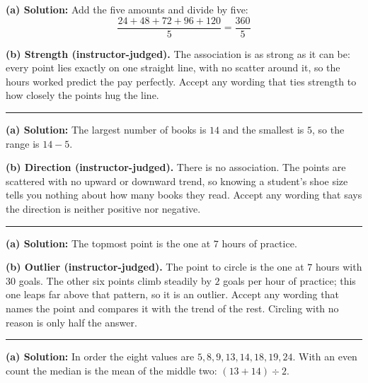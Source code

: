 \documentclass[12pt]{article}
\begin{document}
\textbf{(a) Solution:} \quad Add the five amounts and divide by five:
\[ \frac{24 + 48 + 72 + 96 + 120}{5} = \frac{360}{5} \]

\textbf{(b) Strength (instructor-judged).} The association is as strong as it can be: every
point lies exactly on one straight line, with no scatter around it, so the hours worked predict
the pay perfectly. Accept any wording that ties strength to how closely the points hug the line.

\vspace{0.2cm}

\noindent\rule{\linewidth}{0.2pt}


\textbf{(a) Solution:} \quad The largest number of books is $14$ and the smallest is $5$, so the
range is $14 - 5$. 

\textbf{(b) Direction (instructor-judged).} There is no association. The points are scattered
with no upward or downward trend, so knowing a student's shoe size tells you nothing about how
many books they read. Accept any wording that says the direction is neither positive nor
negative.

\vspace{0.2cm}

\noindent\rule{\linewidth}{0.2pt}


\textbf{(a) Solution:} \quad The topmost point is the one at $7$ hours of practice. 

\textbf{(b) Outlier (instructor-judged).} The point to circle is the one at $7$ hours with $30$
goals. The other six points climb steadily by $2$ goals per hour of practice; this one leaps far
above that pattern, so it is an outlier. Accept any wording that names the point and compares it
with the trend of the rest. Circling with no reason is only half the answer.

\vspace{0.2cm}

\noindent\rule{\linewidth}{0.2pt}


\textbf{(a) Solution:} \quad In order the eight values are $5, 8, 9, 13, 14, 18, 19, 24$. With an
even count the median is the mean of the middle two: $(13 + 14) \div 2$. 
\end{document}
